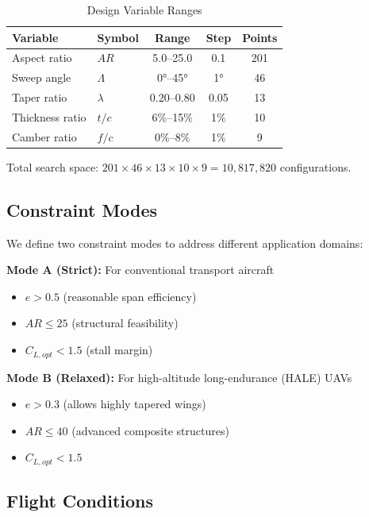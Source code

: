 \documentclass[11pt,a4paper]{article}
\begin{document}
\begin{table}[h]
\centering
\caption{Design Variable Ranges}
\label{tab:design_vars}
\begin{tabular}{llccc}
\hline\hline
Variable & Symbol & Range & Step & Points \\
\hline
Aspect ratio & $AR$ & 5.0--25.0 & 0.1 & 201 \\
Sweep angle & $\Lambda$ & 0°--45° & 1° & 46 \\
Taper ratio & $\lambda$ & 0.20--0.80 & 0.05 & 13 \\
Thickness ratio & $t/c$ & 6\%--15\% & 1\% & 10 \\
Camber ratio & $f/c$ & 0\%--8\% & 1\% & 9 \\
\hline\hline
\end{tabular}
\end{table}

Total search space: $201 \times 46 \times 13 \times 10 \times 9 = 10,817,820$ configurations.

\subsection{Constraint Modes}

We define two constraint modes to address different application domains:

\textbf{Mode A (Strict):} For conventional transport aircraft
\begin{itemize}
    \item $e > 0.5$ (reasonable span efficiency)
    \item $AR \leq 25$ (structural feasibility)
    \item $C_{L,opt} < 1.5$ (stall margin)
\end{itemize}

\textbf{Mode B (Relaxed):} For high-altitude long-endurance (HALE) UAVs
\begin{itemize}
    \item $e > 0.3$ (allows highly tapered wings)
    \item $AR \leq 40$ (advanced composite structures)
    \item $C_{L,opt} < 1.5$
\end{itemize}

\subsection{Flight Conditions}
\end{document}
